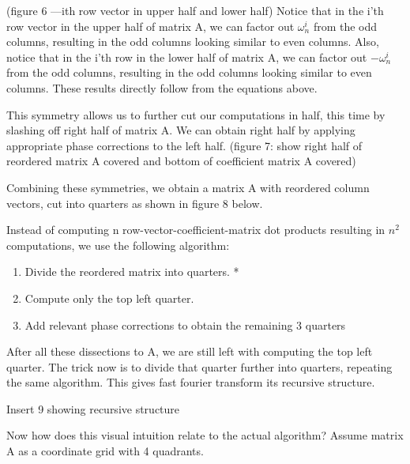 \documentclass{article}
\newcommand{\om}{\omega_n}
\begin{document}
\begin{enumerate}
      (figure 6 ---ith row vector in upper half and lower half)
      Notice that in the i'th row vector in the upper half of matrix A, we can
      factor out \(\om^i\) from the odd columns, resulting in the odd columns
      looking similar to even columns. Also, notice that in the i'th row
      in the lower half of matrix A, we can
      factor out \(-\om^i\) from the odd columns, resulting in the odd columns
      looking similar to even columns. These results directly follow from the
      equations above.

      This symmetry allows us to further cut our computations in half, this
      time by slashing off right half of matrix A. We can obtain right half
      by applying appropriate phase corrections to the left half.
      (figure 7: show right half of reordered matrix A covered and bottom
      of coefficient matrix A covered)

    \end{enumerate}
    Combining these symmetries, we obtain a matrix A with reordered column vectors,
    cut into quarters as shown in figure 8 below.

    Instead of computing n row-vector-coefficient-matrix dot products resulting
    in \(n^2\) computations, we use the following algorithm:
    \begin{enumerate}
      \item Divide the reordered matrix into quarters. *
      \item Compute only the top left quarter.
      \item Add relevant phase corrections to obtain the remaining 3 quarters
    \end{enumerate}

    After all these dissections to A, we are still left with computing the top left quarter.
    The trick now is to divide that quarter further into quarters, repeating the same
    algorithm. This gives fast fourier transform its recursive structure.

    Insert 9 showing recursive structure

    Now how does this visual intuition relate to the actual algorithm? Assume
    matrix A as a coordinate grid with 4 quadrants.
\end{document}
